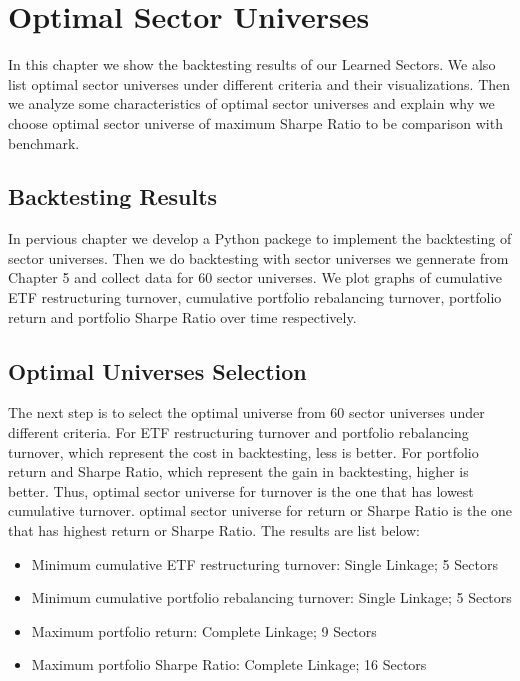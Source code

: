 \documentclass[../main.tex]{subfiles}
\begin{document}
    
\chapter{Optimal Sector Universes}

In this chapter we show the backtesting results of our Learned Sectors. We also list optimal sector universes under different criteria and their visualizations. Then we analyze some characteristics of optimal sector universes and explain why we choose optimal sector universe of maximum Sharpe Ratio to be comparison with benchmark. 

\section{Backtesting Results}

In pervious chapter we develop a Python packege to implement the backtesting of sector universes. Then we do backtesting with sector universes we gennerate from Chapter 5 and collect data for 60 sector universes. We plot graphs of cumulative ETF restructuring turnover, cumulative portfolio rebalancing turnover, portfolio return and portfolio Sharpe Ratio over time respectively. 


\section{Optimal Universes Selection}

The next step is to select the optimal universe from 60 sector universes under different criteria. For ETF restructuring turnover and portfolio rebalancing turnover, which represent the cost in backtesting, less is better. For portfolio return and Sharpe Ratio, which represent the gain in backtesting, higher is better. Thus, optimal sector universe for turnover is the one that has lowest cumulative turnover. optimal sector universe for return or Sharpe Ratio is the one that has highest return or Sharpe Ratio. The results are list below: 

\begin{itemize}
	\item Minimum cumulative ETF restructuring turnover: Single Linkage; 5 Sectors
	\item Minimum cumulative portfolio rebalancing turnover: Single Linkage; 5 Sectors
	\item Maximum portfolio return: Complete Linkage; 9 Sectors
	\item Maximum portfolio Sharpe Ratio: Complete Linkage; 16 Sectors
\end{itemize}
    
\end{document}
